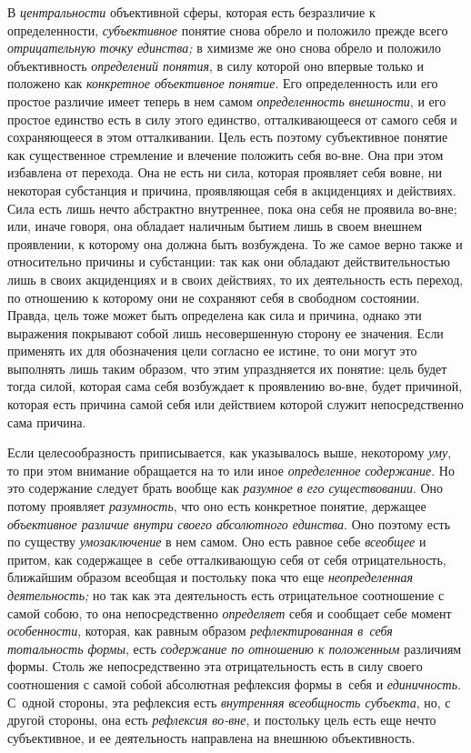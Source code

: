 В {\em центральности} объективной сферы, которая есть безразличие
к определенности, {\em субъективное}
понятие снова обрело и положило прежде всего
{\em отрицательную точку единства;}
в химизме же оно снова обрело и положило объективность
{\em определений понятия},
в силу которой оно впервые только и положено как
{\em конкретное объективное понятие}.
Его определенность или его простое различие имеет теперь в
нем самом {\em определенность
внешности}, и его простое единство есть в силу этого
единство, отталкивающееся от самого себя и сохраняющееся в этом
отталкивании. Цель есть поэтому субъективное понятие как существенное
стремление и влечение положить себя во-вне. Она при этом избавлена от
перехода. Она не есть ни сила, которая проявляет себя вовне, ни некоторая
субстанция и причина, проявляющая себя в акциденциях и действиях. Сила есть
лишь нечто абстрактно внутреннее, пока она себя не проявила во-вне; или,
иначе говоря, она обладает наличным бытием лишь в своем внешнем проявлении,
к которому она должна быть возбуждена. То же самое верно также и
относительно причины и субстанции: так как они обладают действительностью
лишь в своих акциденциях и в своих действиях, то их деятельность есть
переход, по отношению к которому они не сохраняют себя в свободном
состоянии. Правда, цель тоже может быть определена как сила и причина,
однако эти выражения покрывают собой лишь несовершенную сторону ее
значения. Если применять их для обозначения цели согласно ее истине, то они
могут это выполнять лишь таким образом, что этим упраздняется их понятие:
цель будет тогда силой, которая сама себя возбуждает к проявлению во-вне,
будет причиной, которая есть причина самой себя или действием которой
служит непосредственно сама причина.

Если целесообразность приписывается, как указывалось выше,
некоторому {\em уму}, то
при этом внимание обращается на то или иное
{\em определенное содержание}.
Но это содержание следует брать вообще как
{\em разумное в его существовании}.
Оно потому проявляет
{\em разумность}, что оно
есть конкретное понятие, держащее
{\em объективное различие внутри своего
абсолютного единства}. Оно поэтому есть по существу
{\em умозаключение} в нем
самом. Оно есть равное себе
{\em всеобщее} и притом,
как содержащее в~себе отталкивающую себя от себя
отрицательность, ближайшим образом всеобщая и постольку пока
что еще {\em неопределенная
деятельность;} но так как эта деятельность есть
отрицательное соотношение с самой собою, то она непосредственно
{\em определяет} себя и сообщает себе момент {\em особенности},
которая, как равным образом {\em рефлектированная в~себя тотальность
формы}, есть {\em содержание по отношению к
положенным} различиям формы. Столь же непосредственно эта
отрицательность есть в силу своего соотношения с самой собой абсолютная
рефлексия формы в~себя и {\em единичность}.
С~одной стороны, эта рефлексия есть {\em внутренняя всеобщность субъекта},
но, с другой стороны, она есть {\em рефлексия во-вне}, и
постольку цель есть еще нечто субъективное, и ее деятельность направлена на
внешнюю объективность.


